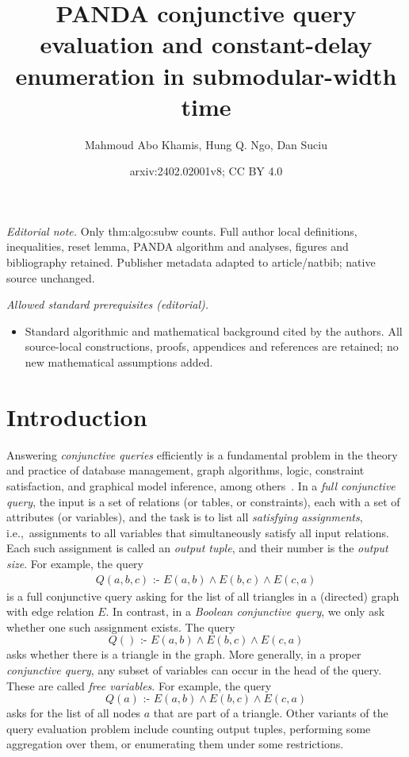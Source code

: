 \documentclass[10pt,a4paper]{article}
\title{PANDA conjunctive query evaluation and constant-delay enumeration in submodular-width time}
\author{Mahmoud Abo Khamis, Hung Q. Ngo, Dan Suciu}
\date{arxiv:2402.02001v8; CC BY 4.0}
\newcommand{\cd}{\text{ :- }}
\begin{document}
\maketitle
\noindent\textit{Editorial note.} Only thm:algo:subw counts. Full author local definitions, inequalities, reset lemma, PANDA algorithm and analyses, figures and bibliography retained. Publisher metadata adapted to article/natbib; native source unchanged.\par\medskip
\noindent\textit{Allowed standard prerequisites (editorial).}\begin{itemize}
\item Standard algorithmic and mathematical background cited by the authors. All source-local constructions, proofs, appendices and references are retained; no new mathematical assumptions added.
\end{itemize}\medskip
\section{Introduction}
Answering {\em conjunctive queries} efficiently is a fundamental problem in the theory and
practice of database management, graph algorithms, logic, constraint satisfaction, and
graphical model inference, among
others~\cite{DBLP:conf/pods/KhamisNR16,DBLP:conf/pods/GottlobGLS16,DBLP:journals/talg/GroheM14,DBLP:books/aw/AbiteboulHV95}.
In a {\em full conjunctive query}, the input is a set of relations (or tables, or
constraints), each with a set of attributes (or variables), and the task is to list all {\em
satisfying assignments}, i.e.,~assignments to all variables that simultaneously satisfy all
input relations.  Each such assignment is called an {\em output tuple}, and their number is
the {\em output size}. For example, the query
\begin{align}
Q(a,b,c) \cd E(a,b) \wedge E(b,c) \wedge E(c,a) \label{eqn:triangle}
\end{align}
is a full conjunctive query asking for the list of all triangles in a (directed) graph with
edge relation $E$.
In contrast, in a {\em Boolean conjunctive query}, we only ask whether one such
assignment exists. The query
\[ Q() \cd E(a,b) \wedge E(b,c) \wedge E(c,a) \]
asks whether there is a triangle in the graph.
More generally, in a proper {\em conjunctive query}, any subset of variables can occur in
the head of the query. These are called {\em free variables}. For example, the query
\[ Q(a) \cd E(a,b) \wedge E(b,c) \wedge E(c,a) \]
asks for the list of all nodes $a$ that are part of a triangle.
Other variants of the query evaluation problem include counting output
tuples, performing some aggregation over them, or enumerating them under some restrictions.
\end{document}

